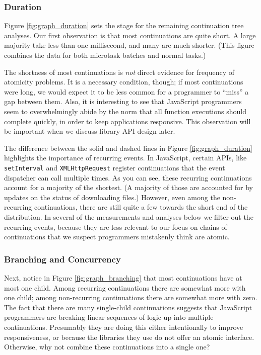 \documentclass[acmsmall,anonymous,review]{acmart}\settopmatter{printfolios=true,printccs=false,printacmref=false}
\begin{document}
\subsubsection{Duration}

Figure \ref{fig:graph_duration} sets the stage for the remaining continuation tree analyses.
Our first observation is that most continuations are quite short.
A large majority take less than one millisecond, and many are much shorter.
(This figure combines the data for both microtask batches and normal tasks.)

The shortness of most continuations is \emph{not} direct evidence for frequency of atomicity problems.
It is a necessary condition, though; if most continuations were long, we would expect it to be less common for a programmer to ``miss'' a gap between them.
Also, it is interesting to see that JavaScript programmers seem to overwhelmingly abide by the norm that all function executions should complete quickly, in order to keep applications responsive.
This observation will be important when we discuss library API design later.

The difference between the solid and dashed lines in Figure \ref{fig:graph_duration} highlights the importance of recurring events.
In JavaScript, certain APIs, like \texttt{setInterval} and \texttt{XMLHttpRequest} register continuations that the event dispatcher can call multiple times.
As you can see, these recurring continuations account for a majority of the shortest.
(A majority of those are accounted for by updates on the status of downloading files.)
However, even among the non-recurring continuations, there are still quite a few towards the short end of the distribution.
In several of the measurements and analyses below we filter out the recurring events, because they are less relevant to our focus on chains of continuations that we suspect programmers mistakenly think are atomic.

\subsubsection{Branching and Concurrency}

Next, notice in Figure \ref{fig:graph_branching} that most continuations have at most one child.
Among recurring continuations there are somewhat more with one child; among non-recurring continuations there are somewhat more with zero.
The fact that there are many single-child continuations suggests that JavaScript programmers are breaking linear sequences of logic up into multiple continuations.
Presumably they are doing this either intentionally to improve responsiveness, or because the libraries they use do not offer an atomic interface.
Otherwise, why not combine these continuations into a single one?
\end{document}
